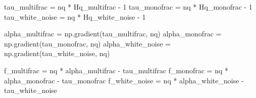 \documentclass[
  letterpaper,
]{report}
\newenvironment{Shaded}{\begin{snugshade}}{\end{snugshade}}
\newcommand{\DecValTok}[1]{\textcolor[rgb]{0.68,0.00,0.00}{#1}}
\newcommand{\NormalTok}[1]{\textcolor[rgb]{0.00,0.23,0.31}{#1}}
\newcommand{\OperatorTok}[1]{\textcolor[rgb]{0.37,0.37,0.37}{#1}}
\begin{document}
\begin{Shaded}
\begin{Highlighting}[]
\NormalTok{tau\_multifrac }\OperatorTok{=}\NormalTok{ nq }\OperatorTok{*}\NormalTok{ Hq\_multifrac }\OperatorTok{{-}} \DecValTok{1} 
\NormalTok{tau\_monofrac }\OperatorTok{=}\NormalTok{ nq }\OperatorTok{*}\NormalTok{ Hq\_monofrac }\OperatorTok{{-}} \DecValTok{1} 
\NormalTok{tau\_white\_noise }\OperatorTok{=}\NormalTok{ nq }\OperatorTok{*}\NormalTok{ Hq\_white\_noise }\OperatorTok{{-}} \DecValTok{1} 

\NormalTok{alpha\_multifrac }\OperatorTok{=}\NormalTok{ np.gradient(tau\_multifrac, nq)}
\NormalTok{alpha\_monofrac }\OperatorTok{=}\NormalTok{ np.gradient(tau\_monofrac, nq)}
\NormalTok{alpha\_white\_noise }\OperatorTok{=}\NormalTok{ np.gradient(tau\_white\_noise, nq)}

\NormalTok{f\_multifrac }\OperatorTok{=}\NormalTok{ nq }\OperatorTok{*}\NormalTok{ alpha\_multifrac }\OperatorTok{{-}}\NormalTok{ tau\_multifrac}
\NormalTok{f\_monofrac }\OperatorTok{=}\NormalTok{ nq }\OperatorTok{*}\NormalTok{ alpha\_monofrac }\OperatorTok{{-}}\NormalTok{ tau\_monofrac}
\NormalTok{f\_white\_noise }\OperatorTok{=}\NormalTok{ nq }\OperatorTok{*}\NormalTok{ alpha\_white\_noise }\OperatorTok{{-}}\NormalTok{ tau\_white\_noise}
\end{Highlighting}
\end{Shaded}
\end{document}
